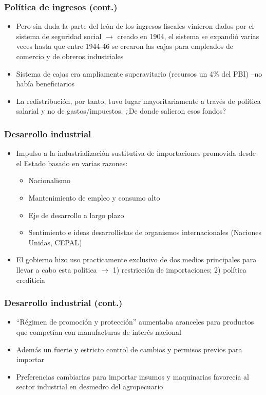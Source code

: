 \documentclass[14pt,aspectratio=169]{beamer}
\begin{document}
\begin{frame}\frametitle{Política de ingresos (cont.)}
    \begin{itemize}\itemsep 10pt
    \item Pero sin duda la parte del león de los ingresos fiscales
      vinieron dados por el sistema de seguridad social
      $\longrightarrow$ creado en 1904, el sistema se expandió varias
      veces hasta que entre 1944-46 se crearon las cajas para
      empleados de comercio y de obreros industriales
      \item Sistema de cajas era ampliamente superavitario (recursos
        un 4\% del
        PBI)  --no había
        beneficiarios
        \item  La redistribución, por tanto, tuvo lugar
          mayoritariamente a través de política salarial y no de
          gastos/impuestos. ¿De donde salieron esos fondos?
                 \end{itemize}
      \end{frame}



      
\begin{frame}\frametitle{Desarrollo industrial}
    \begin{itemize}\itemsep 10pt
    \item Impulso a la industrialización sustitutiva de importaciones promovida desde el Estado
      basado en varias razones:
      \begin{itemize}\itemsep 10pt \medskip
      \item Nacionalismo
      \item Mantenimiento de empleo y consumo alto
      \item Eje de desarrollo a largo plazo
        \item Sentimiento e ideas desarrollistas de organismos internacionales
          (Naciones Unidas, CEPAL)
      \end{itemize}
        \item El gobierno hizo uso practicamente exclusivo de dos
          medios principales para llevar a cabo esta política
          $\longrightarrow$ 1) restricción de importaciones; 2)
          política crediticia
                 \end{itemize}
      \end{frame}
  
      
\begin{frame}\frametitle{Desarrollo industrial (cont.)}
    \begin{itemize}\itemsep 10pt
    \item ``Régimen de promoción y protección'' aumentaba aranceles
      para productos que competían con manufacturas de interés
      nacional
      \item Además un fuerte y estricto control de cambios y permisos
        previos para importar
        \item Preferencias cambiarias para importar insumos y
          maquinarias favorecía al sector industrial en desmedro del agropecuario
                 \end{itemize}
      \end{frame}
  
\end{document}
